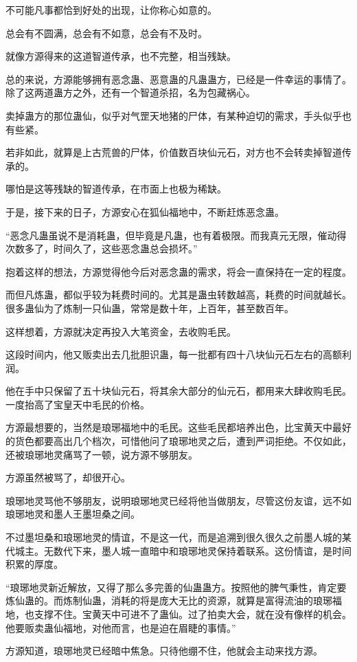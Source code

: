 \begin{this_body}
不可能凡事都恰到好处的出现，让你称心如意的。

总会有不圆满，总会有不如意，总会有不及时。

就像方源得来的这道智道传承，也不完整，相当残缺。

总的来说，方源能够拥有恶念蛊、恶意蛊的凡蛊蛊方，已经是一件幸运的事情了。除了这两道蛊方之外，还有一个智道杀招，名为包藏祸心。

卖掉蛊方的那位蛊仙，似乎对气罡天地猪的尸体，有某种迫切的需求，手头似乎也有些紧。

若非如此，就算是上古荒兽的尸体，价值数百块仙元石，对方也不会转卖掉智道传承的。

哪怕是这等残缺的智道传承，在市面上也极为稀缺。

于是，接下来的日子，方源安心在狐仙福地中，不断赶炼恶念蛊。

“恶念凡蛊虽说不是消耗蛊，但毕竟是凡蛊，也有着极限。而我真元无限，催动得次数多了，时间久了，这些恶念蛊总会损坏。”

抱着这样的想法，方源觉得他今后对恶念蛊的需求，将会一直保持在一定的程度。

而但凡炼蛊，都似乎较为耗费时间的。尤其是蛊虫转数越高，耗费的时间就越长。很多蛊仙为了炼制一只仙蛊，常常是数十年，上百年，甚至数百年。

这样想着，方源就决定再投入大笔资金，去收购毛民。

这段时间内，他又贩卖出去几批胆识蛊，每一批都有四十八块仙元石左右的高额利润。

他在手中只保留了五十块仙元石，将其余大部分的仙元石，都用来大肆收购毛民。一度抬高了宝皇天中毛民的价格。

方源最想要的，当然是琅琊福地中的毛民。这些毛民都培养出色，比宝黄天中最好的货色都要高出几个档次，可惜他问了琅琊地灵之后，遭到严词拒绝。不仅如此，还被琅琊地灵痛骂了一顿，说方源不够朋友。

方源虽然被骂了，却很开心。

琅琊地灵骂他不够朋友，说明琅琊地灵已经将他当做朋友，尽管这份友谊，远不如琅琊地灵和墨人王墨坦桑之间。

不过墨坦桑和琅琊地灵的情谊，不是这一代，而是追溯到很久很久之前墨人城的某代城主。无数代下来，墨人城一直暗中和琅琊地灵保持着联系。这份情谊，是时间积累的厚度。

“琅琊地灵新近解放，又得了那么多完善的仙蛊蛊方。按照他的脾气秉性，肯定要炼仙蛊的。而炼制仙蛊，消耗的将是庞大无比的资源，就算是富得流油的琅琊福地，也支撑不住。宝黄天中可进不了蛊仙。过了拍卖大会，就在没有像样的机会。他要贩卖蛊仙福地，对他而言，也是迫在眉睫的事情。”

方源知道，琅琊地灵已经暗中焦急。只待他绷不住，他就会主动来找方源。


\end{this_body}
